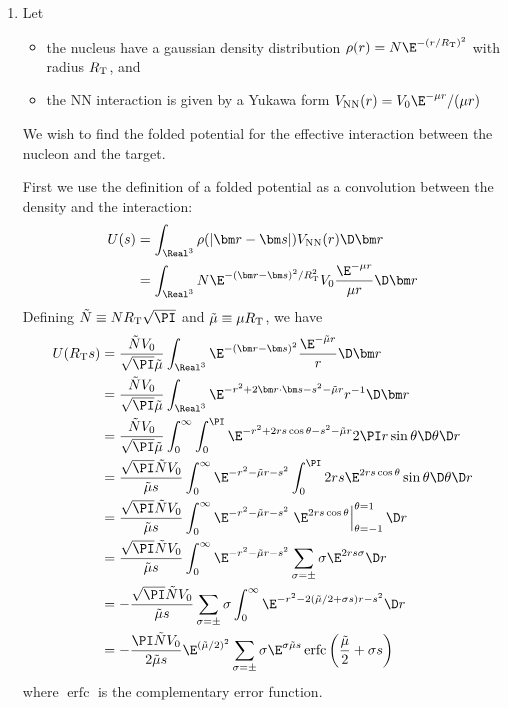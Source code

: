 \documentclass[fleqn, 12pt]{article}
\begin{document}
\begin{enumerate}
\item Let
  \begin{itemize}
  \item the nucleus have a gaussian density distribution
    $\rho(r) = N \E^{-(r / R_{\text T})^2}$ with radius $R_{\text T}$, and
  \item the NN interaction is given by a Yukawa form
    $V_{\text{NN}}(r) = V_0 \E^{-\mu r} / (\mu r)$
  \end{itemize}
  We wish to find the folded potential for the effective interaction between
  the nucleon and the target.

  First we use the definition of a folded potential as a convolution between
  the density and the interaction:
  \begin{align*}
    U(s)
    &= \int_{\Real^3} \rho(|\bm r - \bm s|) V_{\text{NN}}(r) \D \bm r \\
    &= \int_{\Real^3} N \E^{-(\bm r - \bm s)^2/R_{\text T}^2} V_0 \frac{\E^{-\mu r}}{\mu r} \D \bm r
  \end{align*}
  Defining $\tilde N \equiv N R_{\text T} \sqrt\PI$ and
  $\tilde \mu \equiv \mu R_{\text T}$, we have
  \begin{align*}
    U(R_{\text T} s)
    &= \frac{\tilde N V_0}{\sqrt\PI \tilde\mu}
      \int_{\Real^3} \E^{-(\bm r - \bm s)^2} \frac{\E^{-\tilde\mu r}}{r} \D \bm r
    \\
    &= \frac{\tilde N V_0}{\sqrt\PI \tilde\mu} \int_{\Real^3} \E^{-r^2 + 2 \bm r \cdot \bm s - s^2 - \tilde\mu r} r^{-1} \D \bm r
    \\
    &= \frac{\tilde N V_0}{\sqrt\PI \tilde\mu} \int_0^\infty \int_0^\PI \E^{-r^2 + 2 r s \cos \theta - s^2 - \tilde\mu r} 2 \PI r \sin \theta \D \theta \D r
    \\
    &= \frac{\sqrt\PI \tilde N V_0}{\tilde\mu s} \int_0^\infty \E^{-r^2 - \tilde\mu r - s^2} \int_0^\PI 2 r s \E^{2 r s \cos \theta} \sin \theta \D \theta \D r
    \\
    &= \frac{\sqrt\PI \tilde N V_0}{\tilde\mu s} \int_0^\infty \E^{-r^2 - \tilde\mu r - s^2} \left.\E^{2 r s \cos \theta}\right|_{\theta=-1}^{\theta=1} \D r
    \\
    &= \frac{\sqrt\PI \tilde N V_0}{\tilde\mu s} \int_0^\infty \E^{-r^2 - \tilde\mu r - s^2} \sum_{\sigma = \pm} \sigma \E^{2 r s \sigma} \D r
    \\
    &= -\frac{\sqrt\PI \tilde N V_0}{\tilde\mu s} \sum_{\sigma = \pm} \sigma \int_0^\infty \E^{-r^2 - 2 (\tilde\mu / 2 + \sigma s) r - s^2}\D r
    \\
    &= -\frac{\PI \tilde N V_0}{2 \tilde\mu s} \E^{(\tilde\mu / 2)^2} \sum_{\sigma  = \pm} \sigma \E^{\sigma \tilde\mu s} \operatorname{erfc}\left(\frac{\tilde\mu}{2} + \sigma s\right)
  \end{align*}
where $\operatorname{erfc}$ is the complementary error function.

\end{enumerate}
\end{document}
